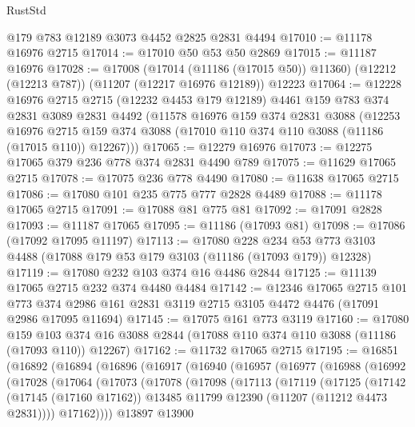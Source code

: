 \begin{lexlean}{RustStd}
\begin{coremodule}
    @179
    @783
    @12189
    @3073
    @4452
    @2825
    @2831
    @4494
@17010 := @11178 @16976 @2715
@17014 := @17010 @50 @53 @50 @2869
@17015 := @11187 @16976
@17028 := @17008
    (@17014 (@11186 (@17015 @50)) @11360)
    (@12212 (@12213 @787))
    (@11207 (@12217 @16976 @12189))
    @12223
@17064 := @12228
    @16976
    @2715
    @2715
    (@12232 @4453 @179 @12189)
    @4461
    @159
    @783
    @374
    @2831
    @3089
    @2831
    @4492
    (@11578
      @16976
      @159
      @374
      @2831
      @3088
      (@12253
        @16976
        @2715
        @159
        @374
        @3088
        (@17010 @110 @374 @110 @3088 (@11186 (@17015 @110)) @12267)))
@17065 := @12279 @16976
@17073 := @12275 @17065 @379 @236 @778 @374 @2831 @4490 @789
@17075 := @11629 @17065 @2715
@17078 := @17075 @236 @778 @4490
@17080 := @11638 @17065 @2715
@17086 := @17080 @101 @235 @775 @777 @2828 @4489
@17088 := @11178 @17065 @2715
@17091 := @17088 @81 @775 @81
@17092 := @17091 @2828
@17093 := @11187 @17065
@17095 := @11186 (@17093 @81)
@17098 := @17086 (@17092 @17095 @11197)
@17113 := @17080
    @228
    @234
    @53
    @773
    @3103
    @4488
    (@17088 @179 @53 @179 @3103 (@11186 (@17093 @179)) @12328)
@17119 := @17080 @232 @103 @374 @16 @4486 @2844
@17125 := @11139 @17065 @2715 @232 @374 @4480 @4484
@17142 := @12346
    @17065
    @2715
    @101
    @773
    @374
    @2986
    @161
    @2831
    @3119
    @2715
    @3105
    @4472
    @4476
    (@17091 @2986 @17095 @11694)
@17145 := @17075 @161 @773 @3119
@17160 := @17080
    @159
    @103
    @374
    @16
    @3088
    @2844
    (@17088 @110 @374 @110 @3088 (@11186 (@17093 @110)) @12267)
@17162 := @11732 @17065 @2715
@17195 := @16851
    (@16892
      (@16894
        (@16896
          (@16917
            (@16940
              (@16957
                (@16977
                  (@16988
                    (@16992
                      (@17028
                        (@17064
                          (@17073
                            (@17078
                              (@17098
                                (@17113
                                  (@17119
                                    (@17125
                                      (@17142
                                        (@17145 (@17160 @17162))
                                        @13485
                                        @11799
                                        @12390
                                        (@11207 (@11212 @4473 @2831))))
                                    @17162))))
                            @13897
                            @13900

\end{coremodule}
\end{lexlean}
